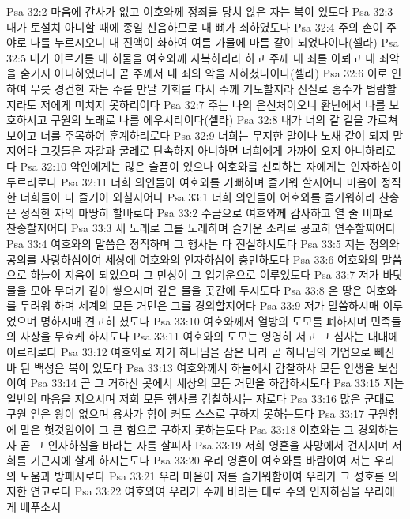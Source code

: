 Psa 32:2  마음에 간사가 없고 여호와께 정죄를 당치 않은 자는 복이 있도다
Psa 32:3  내가 토설치 아니할 때에 종일 신음하므로 내 뼈가 쇠하였도다
Psa 32:4  주의 손이 주야로 나를 누르시오니 내 진액이 화하여 여름 가물에 마름 같이 되었나이다(셀라)
Psa 32:5  내가 이르기를 내 허물을 여호와께 자복하리라 하고 주께 내 죄를 아뢰고 내 죄악을 숨기지 아니하였더니 곧 주께서 내 죄의 악을 사하셨나이다(셀라)
Psa 32:6  이로 인하여 무릇 경건한 자는 주를 만날 기회를 타서 주께 기도할지라 진실로 홍수가 범람할지라도 저에게 미치지 못하리이다
Psa 32:7  주는 나의 은신처이오니 환난에서 나를 보호하시고 구원의 노래로 나를 에우시리이다(셀라)
Psa 32:8  내가 너의 갈 길을 가르쳐 보이고 너를 주목하여 훈계하리로다
Psa 32:9  너희는 무지한 말이나 노새 같이 되지 말지어다 그것들은 자갈과 굴레로 단속하지 아니하면 너희에게 가까이 오지 아니하리로다
Psa 32:10  악인에게는 많은 슬픔이 있으나 여호와를 신뢰하는 자에게는 인자하심이 두르리로다
Psa 32:11  너희 의인들아 여호와를 기뻐하며 즐거워 할지어다 마음이 정직한 너희들아 다 즐거이 외칠지어다
Psa 33:1  너희 의인들아 어호와를 즐거워하라 찬송은 정직한 자의 마땅히 할바로다
Psa 33:2  수금으로 여호와께 감사하고 열 줄 비파로 찬송할지어다
Psa 33:3  새 노래로 그를 노래하며 즐거운 소리로 공교히 연주할찌어다
Psa 33:4  여호와의 말씀은 정직하며 그 행사는 다 진실하시도다
Psa 33:5  저는 정의와 공의를 사랑하심이여 세상에 여호와의 인자하심이 충만하도다
Psa 33:6  여호와의 말씀으로 하늘이 지음이 되었으며 그 만상이 그 입기운으로 이루었도다
Psa 33:7  저가 바닷물을 모아 무더기 같이 쌓으시며 깊은 물을 곳간에 두시도다
Psa 33:8  온 땅은 여호와를 두려워 하며 세계의 모든 거민은 그를 경외할지어다
Psa 33:9  저가 말씀하시매 이루었으며 명하시매 견고히 셨도다
Psa 33:10  여호와께서 열방의 도모를 폐하시며 민족들의 사상을 무효케 하시도다
Psa 33:11  여호와의 도모는 영영히 서고 그 심사는 대대에 이르리로다
Psa 33:12  여호와로 자기 하나님을 삼은 나라 곧 하나님의 기업으로 빼신바 된 백성은 복이 있도다
Psa 33:13  여호와께서 하늘에서 감찰하사 모든 인생을 보심이여
Psa 33:14  곧 그 거하신 곳에서 세상의 모든 거민을 하감하시도다
Psa 33:15  저는 일반의 마음을 지으시며 저희 모든 행사를 감찰하시는 자로다
Psa 33:16  많은 군대로 구원 얻은 왕이 없으며 용사가 힘이 커도 스스로 구하지 못하는도다
Psa 33:17  구원함에 말은 헛것임이여 그 큰 힘으로 구하지 못하는도다
Psa 33:18  여호와는 그 경외하는 자 곧 그 인자하심을 바라는 자를 살피사
Psa 33:19  저희 영혼을 사망에서 건지시며 저희를 기근시에 살게 하시는도다
Psa 33:20  우리 영혼이 여호와를 바람이여 저는 우리의 도움과 방패시로다
Psa 33:21  우리 마음이 저를 즐거워함이여 우리가 그 성호를 의지한 연고로다
Psa 33:22  여호와여 우리가 주께 바라는 대로 주의 인자하심을 우리에게 베푸소서
